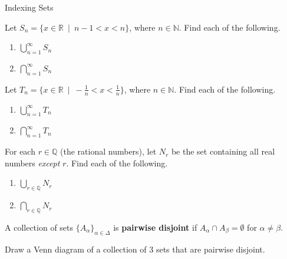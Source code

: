 \begin{section}{Indexing Sets}
\begin{exercise}
Let $S_n = \{x \in \mathbb{R} \ \mid  \ n-1<x<n \}$, where $n\in \mathbb{N}$.  Find each of the following.
\begin{multicols}{2}
\begin{enumerate}[label=\textrm{(\alph*)}]
\item $\displaystyle \bigcup_{n=1}^{\infty}S_n$
\item $\displaystyle \bigcap_{n=1}^{\infty}S_n$
\end{enumerate}
\end{multicols}
\end{exercise}

\begin{exercise}
Let $T_n = \{x \in \mathbb{R} \ \mid  \ -\frac{1}{n}<x< \frac{1}{n} \}$, where $n\in \mathbb{N}$.  Find each of the following.
\begin{multicols}{2}
\begin{enumerate}[label=\textrm{(\alph*)}]
\item $\displaystyle \bigcup_{n=1}^{\infty}T_n$
\item $\displaystyle \bigcap_{n=1}^{\infty}T_n$
\end{enumerate}
\end{multicols}
\end{exercise}

\begin{exercise}
For each $r\in\mathbb{Q}$ (the rational numbers), let $N_r$ be the set containing all real numbers \emph{except} $r$.  Find each of the following.
\begin{multicols}{2}
\begin{enumerate}[label=\textrm{(\alph*)}]
\item $\displaystyle \bigcup_{r\in\mathbb{Q}}N_r$
\item $\displaystyle \bigcap_{r\in\mathbb{Q}}N_r$
\end{enumerate}
\end{multicols}
\end{exercise}

\begin{definition}
A collection of sets $\{A_{\alpha}\}_{\alpha\in\Delta}$ is \textbf{pairwise disjoint} if $A_{\alpha} \cap A_{\beta}=\emptyset$ for $\alpha\neq \beta$.
\end{definition}

\begin{exercise}
Draw a Venn diagram of a collection of 3 sets that are pairwise disjoint.
\end{exercise}


\end{section}
